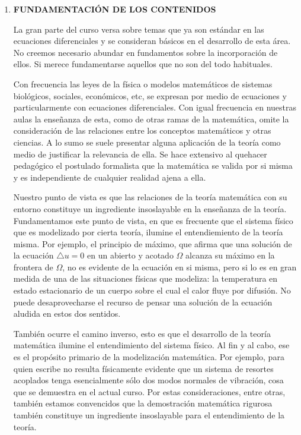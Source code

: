 \documentclass[12pt]{article}
\begin{document}
\begin{enumerate}
 \item\textbf{ FUNDAMENTACIÓN DE LOS CONTENIDOS}

	La gran parte del curso versa sobre temas que ya son estándar en las ecuaciones diferenciales y se consideran básicos en el desarrollo de esta área. No creemos necesario abundar en fundamentos sobre la incorporación de ellos. Si merece fundamentarse aquellos que no son del todo habituales.

	Con frecuencia las leyes de la física o modelos matemáticos de sistemas biológicos, sociales, económicos, etc, se expresan por medio de ecuaciones y particularmente con ecuaciones diferenciales. Con igual frecuencia en nuestras aulas la enseñanza de esta, como de otras  ramas de la matemática, omite la consideración de las relaciones entre los conceptos matemáticos y otras ciencias. A lo sumo se suele presentar alguna aplicación de la teoría como medio de justificar la relevancia de ella. Se hace extensivo al quehacer pedagógico  el postulado formalista que la matemática se valida por si misma y es independiente de cualquier  realidad ajena a ella.

	Nuestro punto de vista es que las relaciones de la teoría matemática con su entorno constituye un ingrediente insoslayable en la enseñanza de la teoría.  Fundamentamos este punto de vista, en que es frecuente que el sistema físico  que es modelizado por cierta teoría, ilumine el entendiemiento de la teoría misma. Por ejemplo, el principio de máximo, que afirma que una solución de la ecuación $\triangle u=0$ en un abierto y acotado $\Omega$ alcanza su máximo en la frontera de $\Omega$, no es evidente de la ecuación en si misma, pero si lo es en gran medida de una de las situaciones físicas que modeliza:  la temperatura en estado estacionario de un cuerpo sobre el cual el calor fluye por difusión. No puede desaprovecharse el recurso de pensar una solución de la ecuación aludida en estos dos sentidos.

	También ocurre el camino inverso, esto es que el desarrollo de la teoría matemática ilumine el entendimiento del sistema físico. Al fin y al cabo, ese es el propósito primario de la modelización matemática. Por ejemplo, para quien escribe no resulta físicamente evidente que un sistema de resortes acoplados tenga esencialmente sólo dos modos normales de vibración, cosa que se demuestra en el actual curso. Por estas consideraciones, entre otras, también estamos convencidos que la demostración matemática rigurosa también constituye un ingrediente insoslayable para el entendimiento de la teoría.


\end{enumerate}
\end{document}
